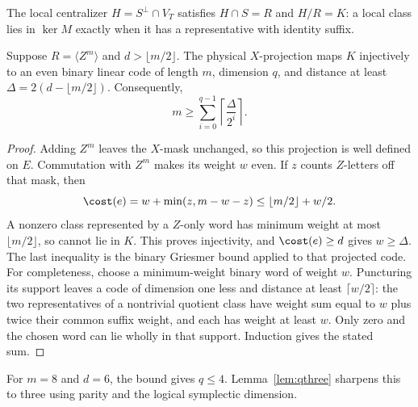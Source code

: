 The local centralizer \(H=S^\perp\cap V_T\) satisfies \(H\cap S=R\)
and \(H/R=K\): a local class lies in \(\ker M\) exactly when it has a
representative with identity suffix.

\begin{proposition}\label{prop:griesmer}
Suppose \(R=\langle Z^m\rangle\) and \(d>\lfloor m/2\rfloor\).
The physical \(X\)-projection maps \(K\) injectively to an even binary
linear code of length \(m\), dimension \(q\), and distance at least
\(\Delta=2(d-\lfloor m/2\rfloor)\). Consequently,
\begin{equation}\label{eq:griesmer}
 m\geq\sum_{i=0}^{q-1}\left\lceil\frac{\Delta}{2^i}\right\rceil.
\end{equation}
\end{proposition}
\begin{proof}
Adding \(Z^m\) leaves the \(X\)-mask unchanged, so this projection is
well defined on \(E\). Commutation with \(Z^m\) makes its weight
\(w\) even. If \(z\) counts \(Z\)-letters off that mask, then
\[
 \cost(e)=w+\min(z,m-w-z)\leq\lfloor m/2\rfloor+w/2.
\]
A nonzero class represented by a \(Z\)-only word has minimum weight at most \(\lfloor m/2\rfloor\),
so cannot lie in \(K\). This proves injectivity, and
\(\cost(e)\geq d\) gives \(w\geq\Delta\).
The last inequality is the binary Griesmer bound applied to that projected
code. For completeness, choose a minimum-weight binary word of weight
\(w\). Puncturing its support leaves a code of dimension one less and
distance at least \(\lceil w/2\rceil\): the two representatives of a
nontrivial quotient class have weight sum equal to \(w\) plus twice
their common suffix weight, and each has weight at least \(w\).
Only zero and the chosen word can lie wholly in that support. Induction
gives the stated sum.
\end{proof}

For \(m=8\) and \(d=6\), the bound gives \(q\leq4\).
Lemma~\ref{lem:qthree} sharpens this to three using parity and the
logical symplectic dimension.
